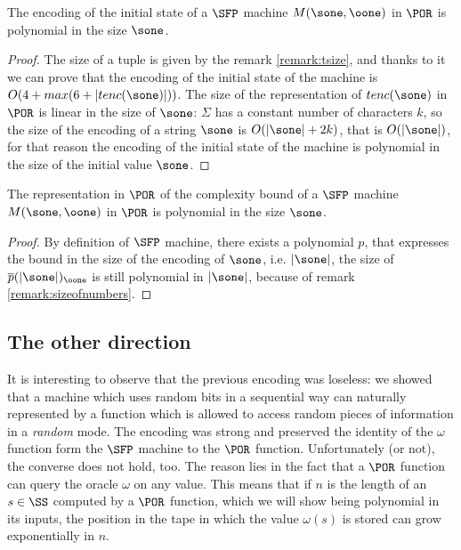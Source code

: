 \begin{lemma}
The encoding of the initial state of a $\SFP$ machine $M (\sone, \oone)$ in $\POR$ is polynomial in the size $\sone$.
\end{lemma}

\begin{proof}
The size of a tuple is given by the remark \ref{remark:tsize}, and thanks to it we can prove that the encoding of the initial state of the machine is $O(4+ max(6+|tenc(\sone)|))$. The size of the representation of $tenc(\sone)$ in $\POR$ is linear in the size of $\sone$: $\Sigma$ has a constant number of characters $k$, so the size of the encoding of a string $\sone$ is $O(|\sone|+ 2k)$, that is $O(|\sone|)$, for that reason the encoding of the initial state of the machine is polynomial in the size of the initial value $\sone$.
\end{proof}

\begin{lemma}
The representation in $\POR$ of the complexity bound of a $\SFP$ machine $M (\sone, \oone)$ in $\POR$ is polynomial in the size $\sone$.
\end{lemma}

\begin{proof}
By definition of $\SFP$ machine, there exists a polynomial $p$, that expresses the bound in the size of the encoding of $\sone$, i.e. $|\sone|$, the size of $\overline p(|\sone|)_\oone$ is still polynomial in $|\sone|$, because of remark \ref{remark:sizeofnumbers}.
\end{proof}


\subsection{The other direction}

It is interesting to observe that the previous encoding was loseless: we showed that a machine which uses random bits in a sequential way can naturally represented by a function which is allowed to access random pieces of information in a \emph{random} mode. The encoding was strong and preserved the identity of the $\omega$ function form the $\SFP$ machine to the $\POR$ function. Unfortunately (or not), the converse does not hold, too. The reason lies in the fact that a $\POR$ function can query the oracle $\omega$ on any value. This means that if $n$ is the length of an $s \in \SS$ computed by a $\POR$ function, which we will show being polynomial in its inputs, the position in the tape in which the value $\omega(s)$ is stored can grow exponentially in $n$.

